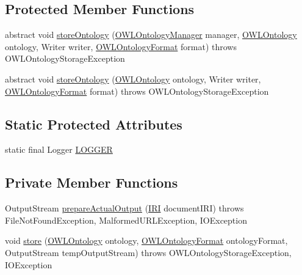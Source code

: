 \subsection*{Protected Member Functions}
\begin{DoxyCompactItemize}
\item 
abstract void \hyperlink{classorg_1_1semanticweb_1_1owlapi_1_1util_1_1_abstract_o_w_l_ontology_storer_aecf45ca52a50c8cad1f6a501c6d51531}{store\-Ontology} (\hyperlink{interfaceorg_1_1semanticweb_1_1owlapi_1_1model_1_1_o_w_l_ontology_manager}{O\-W\-L\-Ontology\-Manager} manager, \hyperlink{interfaceorg_1_1semanticweb_1_1owlapi_1_1model_1_1_o_w_l_ontology}{O\-W\-L\-Ontology} ontology, Writer writer, \hyperlink{classorg_1_1semanticweb_1_1owlapi_1_1model_1_1_o_w_l_ontology_format}{O\-W\-L\-Ontology\-Format} format)  throws O\-W\-L\-Ontology\-Storage\-Exception
\item 
abstract void \hyperlink{classorg_1_1semanticweb_1_1owlapi_1_1util_1_1_abstract_o_w_l_ontology_storer_af2b614d520f12955394f4762a3542021}{store\-Ontology} (\hyperlink{interfaceorg_1_1semanticweb_1_1owlapi_1_1model_1_1_o_w_l_ontology}{O\-W\-L\-Ontology} ontology, Writer writer, \hyperlink{classorg_1_1semanticweb_1_1owlapi_1_1model_1_1_o_w_l_ontology_format}{O\-W\-L\-Ontology\-Format} format)  throws O\-W\-L\-Ontology\-Storage\-Exception
\end{DoxyCompactItemize}
\subsection*{Static Protected Attributes}
\begin{DoxyCompactItemize}
\item 
static final Logger \hyperlink{classorg_1_1semanticweb_1_1owlapi_1_1util_1_1_abstract_o_w_l_ontology_storer_aabe0425e1033e45efcf237c879c2719c}{L\-O\-G\-G\-E\-R}
\end{DoxyCompactItemize}
\subsection*{Private Member Functions}
\begin{DoxyCompactItemize}
\item 
Output\-Stream \hyperlink{classorg_1_1semanticweb_1_1owlapi_1_1util_1_1_abstract_o_w_l_ontology_storer_a2f3fd8cf4ab7223b8b599ef746fa2fc1}{prepare\-Actual\-Output} (\hyperlink{classorg_1_1semanticweb_1_1owlapi_1_1model_1_1_i_r_i}{I\-R\-I} document\-I\-R\-I)  throws File\-Not\-Found\-Exception, Malformed\-U\-R\-L\-Exception, I\-O\-Exception 
\item 
void \hyperlink{classorg_1_1semanticweb_1_1owlapi_1_1util_1_1_abstract_o_w_l_ontology_storer_a484c04ddc145e9056716a0fe9265d093}{store} (\hyperlink{interfaceorg_1_1semanticweb_1_1owlapi_1_1model_1_1_o_w_l_ontology}{O\-W\-L\-Ontology} ontology, \hyperlink{classorg_1_1semanticweb_1_1owlapi_1_1model_1_1_o_w_l_ontology_format}{O\-W\-L\-Ontology\-Format} ontology\-Format, Output\-Stream temp\-Output\-Stream)  throws O\-W\-L\-Ontology\-Storage\-Exception,             I\-O\-Exception 
\end{DoxyCompactItemize}
